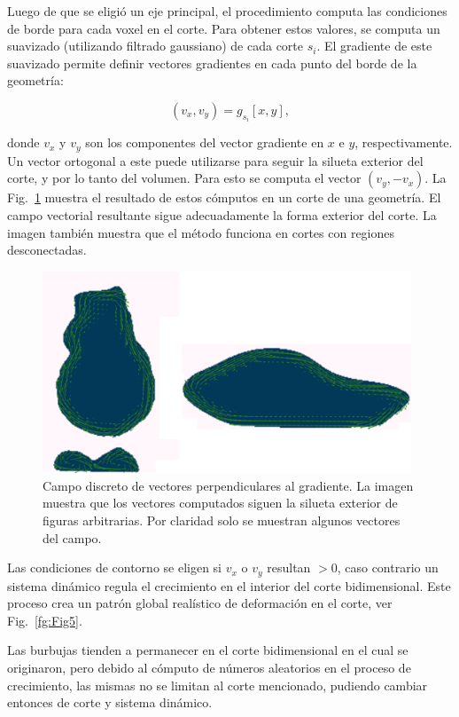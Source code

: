 Luego de que se eligió un eje principal, el procedimiento computa las condiciones de borde para cada voxel en el corte.
Para obtener estos valores, se computa un suavizado (utilizando filtrado gaussiano) de cada corte $s_{i}$.
El gradiente de este suavizado permite definir vectores gradientes en cada punto del borde de la geometría:

$$\displaystyle (v_{x},v_{y}) = g_{s_{i}}[x,y],$$

\noindent donde $v_{x}$ y $v_{y}$ son los componentes del vector gradiente en $x$ e $y$, respectivamente.
Un vector ortogonal a este puede utilizarse para seguir la silueta exterior del corte, y por lo tanto del volumen.
Para esto se computa el vector $(v_{y},-v_{x})$.
La Fig.~\ref{fg:Fig4} muestra el resultado de estos cómputos en un corte de una geometría.
El campo vectorial resultante sigue adecuadamente la forma exterior del corte.
La imagen también muestra que el método funciona en cortes con regiones desconectadas.


\begin{figure}
  \centerline{\includegraphics[width=11cm]{figures/Fig4}}
  \caption{Campo discreto de vectores perpendiculares al gradiente. La imagen muestra que los vectores computados siguen la silueta exterior de figuras arbitrarias. Por claridad solo se muestran algunos vectores del campo.}
  \label{fg:Fig4}
\end{figure}

Las condiciones de contorno se eligen si $v_{x}$ o $v_{y}$ resultan $>0$, caso contrario un sistema dinámico regula el crecimiento en el interior del corte bidimensional.
Este proceso crea un patrón global realístico de deformación en el corte, ver Fig.~\ref{fg:Fig5}.

Las burbujas tienden a permanecer en el corte bidimensional en el cual se originaron, pero debido al cómputo de números aleatorios en el proceso de crecimiento, las mismas no se limitan al corte mencionado, pudiendo cambiar entonces de corte y sistema dinámico.

